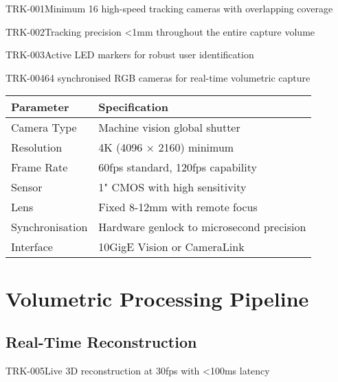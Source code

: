 \begin{requirement}{TRK-001}{Minimum 16 high-speed tracking cameras with overlapping coverage}
\begin{requirement}{TRK-002}{Tracking precision <1mm throughout the entire capture volume}
\begin{requirement}{TRK-003}{Active LED markers for robust user identification}
\begin{requirement}{TRK-004}{64 synchronised RGB cameras for real-time volumetric capture}
\begin{table}[H]
\centering
\begin{tabularx}{\textwidth}{@{}lX@{}}
\toprule
\textbf{Parameter} & \textbf{Specification} \\
\midrule
Camera Type & Machine vision global shutter \\
Resolution & 4K (4096 × 2160) minimum \\
Frame Rate & 60fps standard, 120fps capability \\
Sensor & 1" CMOS with high sensitivity \\
Lens & Fixed 8-12mm with remote focus \\
Synchronisation & Hardware genlock to microsecond precision \\
Interface & 10GigE Vision or CameraLink \\
\bottomrule
\end{tabularx}
\end{table}

\section{Volumetric Processing Pipeline}

\subsection{Real-Time Reconstruction}

\begin{requirement}{TRK-005}{Live 3D reconstruction at 30fps with <100ms latency}

\begin{figure}[H]
\centering
{}
\end{figure}
\end{requirement}
\end{requirement}
\end{requirement}
\end{requirement}
\end{requirement}
